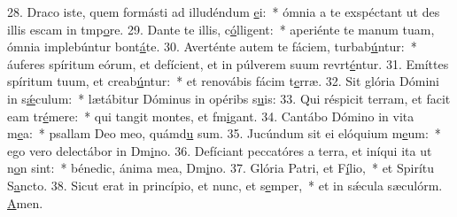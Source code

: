 28. Draco iste, quem formásti ad illudéndum \uline{e}i:~* ómnia a te exspéctant ut des illis escam in tmp\uline{o}re.
29. Dante te illis, c\uline{ó}lligent:~* aperiénte te manum tuam, ómnia implebúntur bont\uline{á}te.
30. Averténte autem te fáciem, turbab\uline{ú}ntur:~* áuferes spíritum eórum, et defícient, et in púlverem suum revrt\uline{é}ntur.
31. Emíttes spíritum tuum, et creab\uline{ú}ntur:~* et renovábis fácim t\uline{e}rræ.
32. Sit glória Dómini in s\uline{ǽ}culum:~* lætábitur Dóminus in opéribs s\uline{u}is:
33. Qui réspicit terram, et facit eam tr\uline{é}mere:~* qui tangit montes, et fm\uline{i}gant.
34. Cantábo Dómino in vita m\uline{e}a:~* psallam Deo meo, quámd\uline{u} sum.
35. Jucúndum sit ei elóquium m\uline{e}um:~* ego vero delectábor in Dm\uline{i}no.
36. Defíciant peccatóres a terra, et iníqui ita ut n\uline{o}n sint:~* bénedic, ánima mea, Dm\uline{i}no.
37. Glória Patri, et F\uline{í}lio,~* et Spirítu S\uline{a}ncto.
38. Sicut erat in princípio, et nunc, et s\uline{e}mper,~* et in sǽcula sæculórm. \uline{A}men.
